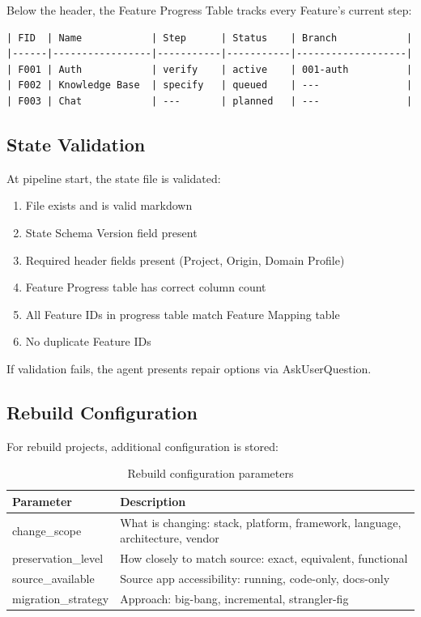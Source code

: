\documentclass[11pt,a4paper,openright,twoside]{report}
\begin{document}
Below the header, the Feature Progress Table tracks every Feature's current step:

\begin{lstlisting}[title={Feature Progress Table}]
| FID  | Name            | Step      | Status    | Branch            |
|------|-----------------|-----------|-----------|-------------------|
| F001 | Auth            | verify    | active    | 001-auth          |
| F002 | Knowledge Base  | specify   | queued    | ---               |
| F003 | Chat            | ---       | planned   | ---               |
\end{lstlisting}

\subsection{State Validation}

At pipeline start, the state file is validated:

\begin{enumerate}
  \item File exists and is valid markdown
  \item State Schema Version field present
  \item Required header fields present (Project, Origin, Domain Profile)
  \item Feature Progress table has correct column count
  \item All Feature IDs in progress table match Feature Mapping table
  \item No duplicate Feature IDs
\end{enumerate}

If validation fails, the agent presents repair options via AskUserQuestion.

\subsection{Rebuild Configuration}

For rebuild projects, additional configuration is stored:

\begin{table}[H]
\centering
\caption{Rebuild configuration parameters}
\label{tab:rebuild-config}
\begin{tabularx}{\textwidth}{lX}
\toprule
\textbf{Parameter} & \textbf{Description} \\
\midrule
change\_scope & What is changing: stack, platform, framework, language, architecture, vendor \\
preservation\_level & How closely to match source: exact, equivalent, functional \\
source\_available & Source app accessibility: running, code-only, docs-only \\
migration\_strategy & Approach: big-bang, incremental, strangler-fig \\
\bottomrule
\end{tabularx}
\end{table}
\end{document}
